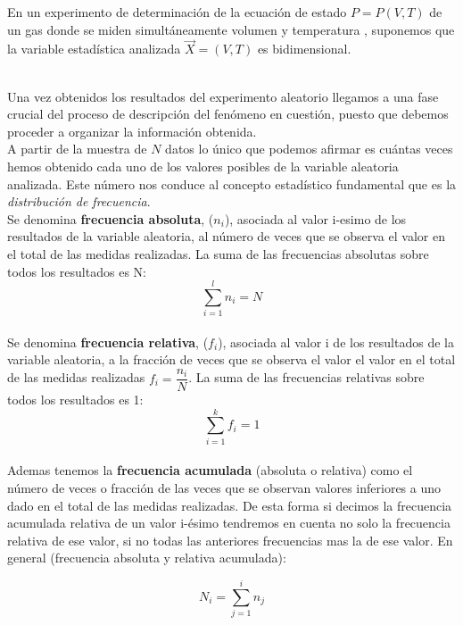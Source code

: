 \documentclass[12pt,a4paper]{book}
\begin{document}

\hrulefill

En un experimento de determinación de la ecuación de estado $P=P(V,T)$ de un gas donde se miden simultáneamente volumen y temperatura , suponemos que la variable estadística analizada $\vec{X} = (V,T)$ es bidimensional.

\hrulefill \\

Una vez obtenidos los resultados del experimento aleatorio llegamos a una fase crucial del proceso de descripción del fenómeno en cuestión, puesto que debemos proceder a organizar la información obtenida. \\

A partir de la muestra de $N$ datos lo único que podemos afirmar es cuántas veces hemos obtenido cada uno de los valores posibles de la variable aleatoria analizada. Este número nos conduce al concepto estadístico fundamental que es la \textit{distribución de frecuencia}. \\


Se denomina \textbf{frecuencia absoluta}, ($n_i$), asociada al valor i-esimo de los resultados de la variable aleatoria, al número de veces que se observa el valor en el total de las medidas realizadas. La suma de las frecuencias absolutas sobre todos los resultados es N:  $$ \sum_{i=1}^l n_i = N $$ \\

Se denomina \textbf{frecuencia relativa}, ($f_i$), asociada al  valor i de los resultados de la variable aleatoria, a la fracción de veces que se observa el valor el valor en el total de las medidas realizadas $ f_i  = \dfrac{n_i}{N} $. La suma de las frecuencias relativas sobre todos los resultados es 1:  $$ \sum_{i=1}^k f_i = 1 $$ \\

Ademas tenemos la \textbf{frecuencia acumulada} (absoluta o relativa) como el número de veces o fracción de las veces que se observan  valores inferiores a uno dado en el total de las medidas realizadas. De esta forma si decimos la frecuencia acumulada relativa de un valor i-ésimo tendremos en cuenta no solo la frecuencia relativa de ese valor, si no todas las anteriores frecuencias mas la de ese valor. En general (frecuencia absoluta y relativa acumulada): 

\begin{equation}
N_i = \sum_{j=1}^i n_j
\end{equation}
\end{document}
